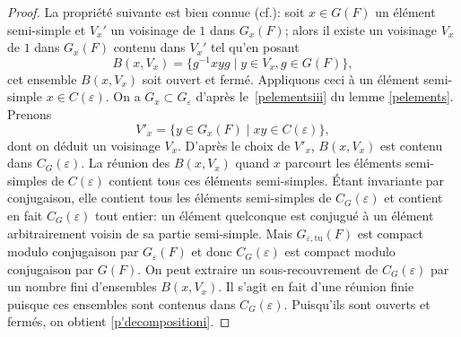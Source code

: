 \documentclass[11pt]{article}
\newcommand{\cf}{cf.\xspace}
\numberwithin{equation}{section}\providecommand{\og}{«\,}\providecommand{\fg}{\,»}
\let\epsilon\varepsilon
\let\sep\mid
\newcommand{\tu}{\mathrm{tu}}
\theoremstyle{plain}
\theoremstyle{definition}
\begin{document}
\begin{proof}
La propriété suivante est bien connue (\cf \cite[Cor.\,2.4]{HC}): soit \hbox{$x\in G(F)$} un élément semi-simple et $V_{x}'$ un voisinage de $1$ dans $G_{x}(F)$; alors il existe un voisinage $V_{x}$ de $1$ dans $G_{x}(F)$ contenu dans $V_{x}'$ tel qu'en posant
\[
B(x,V_{x})=\{ g^{-1} xyg\sep y\in V_{x}, g\in G(F)\},
\]
cet ensemble $B(x,V_{x})$ soit ouvert et fermé. Appliquons ceci à un élément semi-simple $x \in C(\epsilon)$. On a $G_{x}\subset G_{\epsilon}$ d'après le~\eqref{pelementsiii} du lemme \ref{pelements}. Prenons
\[
V'_{x}=\{y\in G_{x}(F)\sep xy\in C(\epsilon)\},
\]
dont on déduit un voisinage $V_{x}$. D'après le choix de $V'_{x}$, $B(x,V_{x})$ est contenu dans $C_{G}(\epsilon)$. La réunion des $B(x,V_{x})$ quand $x$ parcourt les éléments semi-simples de $C(\epsilon)$ contient tous ces éléments semi-simples. Étant invariante par conjugaison, elle contient tous les éléments semi-simples de $C_{G}(\epsilon)$ et contient en fait $C_{G}(\epsilon)$ tout entier: un élément quelconque est conjugué à un élément arbitrairement voisin de sa partie semi-simple. Mais $G_{\epsilon,\tu}(F)$ est compact modulo conjugaison par $G_{\epsilon}(F)$ et donc $C_{G}(\epsilon)$ est compact modulo conjugaison par $G(F)$. On peut extraire un sous-recouvrement de $C_{G}(\epsilon)$ par un nombre fini d'ensembles $B(x,V_{x})$. Il s'agit en fait d'une réunion finie puisque ces ensembles sont contenus dans $C_{G}(\epsilon)$. Puisqu'ils sont ouverts et fermés, on obtient \eqref{p'decompositioni}.


\end{proof}
\end{document}
